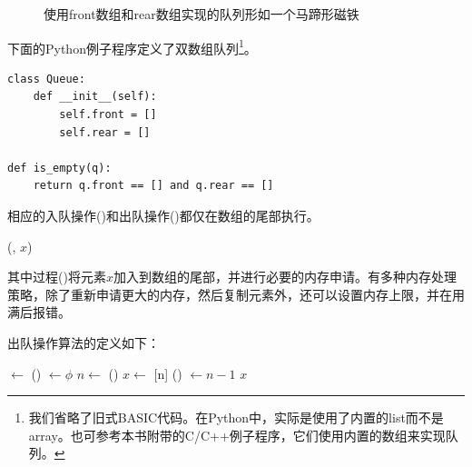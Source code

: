 \documentclass[b5paper]{ctexart}
\begin{document}
\begin{figure}[htbp]
  \centering
  \caption{使用front数组和rear数组实现的队列形如一个马蹄形磁铁} \label{fig:horseshoe-array}
\end{figure}

下面的Python例子程序定义了双数组队列\footnote{我们省略了旧式BASIC代码。在Python中，实际是使用了内置的list而不是array。也可参考本书附带的C/C++例子程序，它们使用内置的数组来实现队列。}。

\lstset{language=Python}
\begin{lstlisting}
class Queue:
    def __init__(self):
        self.front = []
        self.rear = []

def is_empty(q):
    return q.front == [] and q.rear == []
\end{lstlisting}

相应的入队操作()和出队操作()都仅在数组的尾部执行。

\begin{algorithmic}
  \State {}(, $x$)
\EndFunction
\end{algorithmic}

其中过程()将元素$x$加入到数组的尾部，并进行必要的内存申请。有多种内存处理策略，除了重新申请更大的内存，然后复制元素外，还可以设置内存上限，并在用满后报错。

出队操作算法的定义如下：

\begin{algorithmic}
    \State {} $\gets$ ()
    \State {} $\gets \phi$
  \EndIf
  \State $n \gets$ ()
  \State $x \gets$ [n]
  \State {}() $\gets n - 1$
  \State \Return $x$
\EndFunction
\end{algorithmic}
\end{document}
